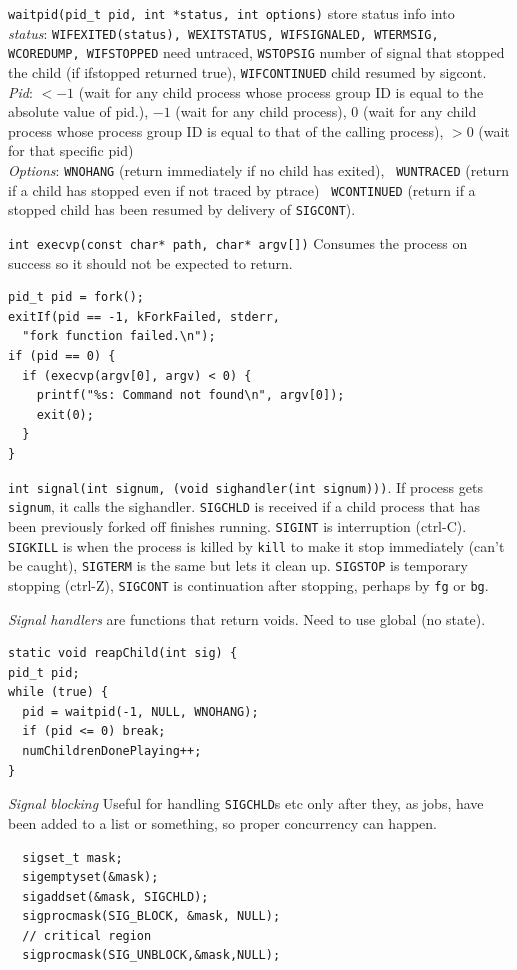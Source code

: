 \documentclass{article}
\begin{document}
\begin{multicols}{2}
  {\tt waitpid(pid\_t pid, int *status, int options)} store status info into\\
  {\it status}: {\tt WIFEXITED(status), WEXITSTATUS, WIFSIGNALED, WTERMSIG,
  WCOREDUMP, WIFSTOPPED} need untraced, {\tt WSTOPSIG} number of signal that
  stopped the child (if ifstopped returned true), {\tt WIFCONTINUED} child
  resumed by
  sigcont.\\
  {\it Pid}: $<-1$ (wait for any child process whose process group ID is equal to the
  absolute value of pid.), $-1$ (wait for any child process), $0$ (wait for any
  child process whose process group ID is equal to that of the calling process),
  $>0$ (wait for that specific pid)\\
  {\it Options}: {\tt WNOHANG} (return immediately if no child has exited), {\tt
  WUNTRACED} (return if a child has stopped even if not traced by ptrace) {\tt
  WCONTINUED} (return if a stopped child has been resumed by delivery of
  \texttt{SIGCONT}).

  {\tt int execvp(const char* path, char* argv[])} Consumes the process on
  success so it should not be expected to return.
\begin{verbatim}
pid_t pid = fork();
exitIf(pid == -1, kForkFailed, stderr,
  "fork function failed.\n");
if (pid == 0) {
  if (execvp(argv[0], argv) < 0) {
    printf("%s: Command not found\n", argv[0]);
    exit(0);
  }
}\end{verbatim}

  {\tt int signal(int signum, (void sighandler(int signum)))}. If process gets
  {\tt signum}, it calls the sighandler. \texttt{SIGCHLD} is received if a child
  process that has been previously forked off finishes running. \texttt{SIGINT}
  is interruption (ctrl-C). \texttt{SIGKILL} is when the process is killed by
  \texttt{kill} to make it stop immediately (can't be caught), \texttt{SIGTERM}
  is the same but lets it clean up. \texttt{SIGSTOP} is temporary stopping
  (ctrl-Z), \texttt{SIGCONT} is continuation after stopping, perhaps by
  \texttt{fg} or \texttt{bg}.

  {\it Signal handlers} are functions that return voids. Need to use global (no
  state).
  \begin{verbatim}
static void reapChild(int sig) {
pid_t pid;
while (true) {
  pid = waitpid(-1, NULL, WNOHANG);
  if (pid <= 0) break;
  numChildrenDonePlaying++;
} \end{verbatim}
  {\it Signal blocking} Useful for handling \texttt{SIGCHLD}s etc only after they, as
  jobs, have been added to a list or something, so proper concurrency can
  happen.
  \begin{verbatim}
  sigset_t mask;
  sigemptyset(&mask);
  sigaddset(&mask, SIGCHLD);
  sigprocmask(SIG_BLOCK, &mask, NULL);
  // critical region
  sigprocmask(SIG_UNBLOCK,&mask,NULL);\end{verbatim}


\end{multicols}
\end{document}
